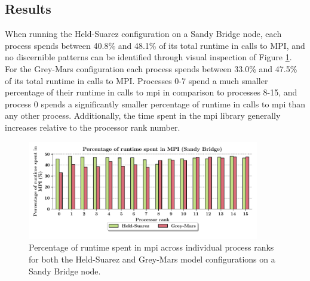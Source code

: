 \documentclass[a4paper,11pt]{report}
\begin{document}
\subsection{Results}
When running the Held-Suarez configuration on a Sandy Bridge node,  each process spends between 40.8\% and 48.1\% of its total runtime in calls to MPI, and no discernible patterns can be identified through visual inspection of Figure \ref{fig:mpi-barrier}. For the Grey-Mars configuration each process spends between 33.0\% and 47.5\% of its total runtime in calls to MPI. Processes 0-7 spend a much smaller percentage of their runtime in calls to \gls{mpi} in comparison to processes 8-15, and process 0 spends a significantly smaller percentage of runtime in calls to \gls{mpi} than any other process. Additionally, the time spent in the \gls{mpi} library generally increases relative to the processor rank number. 
\begin{figure}[H]
\begin{center}
	\includegraphics[width=0.9\textwidth]{img/mpi-barrier-time.pdf}
\caption[Percentage of runtime spent in MPI across processes]{Percentage of runtime spent in \gls{mpi} across individual process ranks for both the Held-Suarez and Grey-Mars model configurations on a Sandy Bridge node.}
\label{fig:mpi-barrier}
\end{center}
\end{figure}
\end{document}
